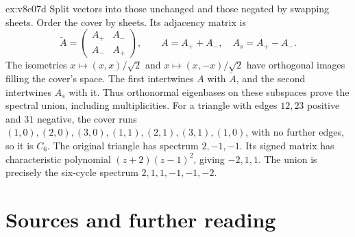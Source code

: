 \begin{solution}{ex:v8c07d}
\idea Split vectors into those unchanged and those negated by swapping sheets.
\writeup Order the cover by sheets. Its adjacency matrix is
\[
\widetilde A=\begin{pmatrix}A_+&A_-\\A_-&A_+\end{pmatrix},
\qquad A=A_++A_-,\quad A_s=A_+-A_-.
\]
The isometries $x\mapsto(x,x)/\sqrt2$ and $x\mapsto(x,-x)/\sqrt2$ have orthogonal images filling the cover's space. The first intertwines $A$ with $\widetilde A$, and the second intertwines $A_s$ with it. Thus orthonormal eigenbases on these subspaces prove the spectral union, including multiplicities.
For a triangle with edges $12,23$ positive and $31$ negative, the cover runs
$(1,0),(2,0),(3,0),(1,1),(2,1),(3,1),(1,0)$,
with no further edges, so it is $C_6$. The original triangle has spectrum $2,-1,-1$. Its signed matrix has characteristic polynomial $(z+2)(z-1)^2$, giving $-2,1,1$. The union is precisely the six-cycle spectrum $2,1,1,-1,-1,-2$.
\end{solution}

\section*{Sources and further reading}

